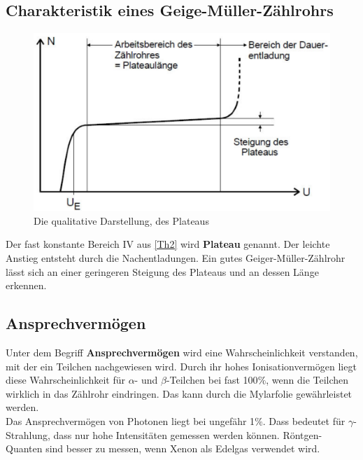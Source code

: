 \subsection{Charakteristik eines Geige-Müller-Zählrohrs}
\begin{figure}[h!]
\centering
\includegraphics[scale=0.75]{Grafiken/Theorie2.pdf}
\caption{Die qualitative Darstellung, des Plateaus \cite{V703}\label{Th3}}
\end{figure}
Der fast konstante Bereich IV aus  \cref{Th2} wird \textbf{Plateau} genannt. Der leichte Anstieg entsteht durch die Nachentladungen. Ein gutes Geiger-Müller-Zählrohr lässt sich an einer geringeren Steigung des Plateaus und an dessen Länge erkennen.
\subsection{Ansprechvermögen}
Unter dem Begriff \textbf{Ansprechvermögen} wird eine Wahrscheinlichkeit verstanden, mit der ein Teilchen nachgewiesen wird. Durch ihr hohes Ionisationvermögen liegt diese Wahrscheinlichkeit für $\alpha$- und $\beta$-Teilchen bei fast 100$\%$, wenn die Teilchen wirklich in das Zählrohr eindringen. Das kann durch die Mylarfolie gewährleistet werden.\\
Das Ansprechvermögen von Photonen liegt bei ungefähr 1$\%$. Dass bedeutet für $\gamma$-Strahlung, dass nur hohe Intensitäten gemessen werden können. Röntgen-Quanten sind besser zu messen, wenn Xenon als Edelgas verwendet wird.